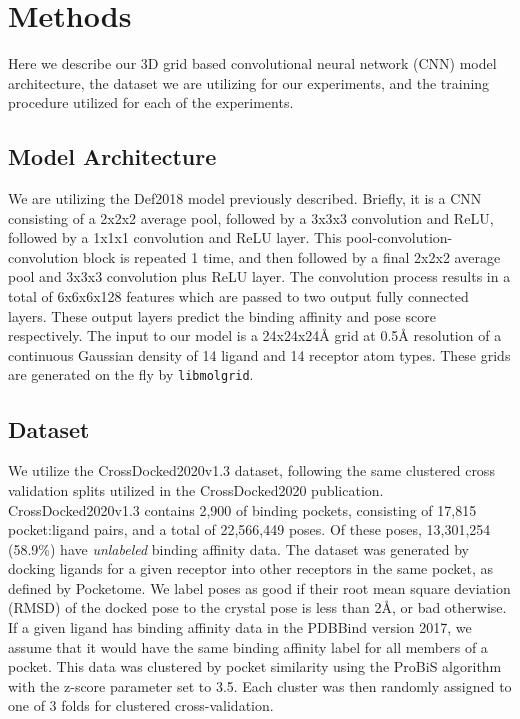 \documentclass[journal=jmcmar,manuscript=article]{achemso}
\begin{document}
\section{Methods}
Here we describe our 3D grid based convolutional neural network (CNN) model architecture, the dataset we are utilizing for our experiments, and the training procedure utilized for each of the experiments.

\subsection{Model Architecture}
We are utilizing the Def2018 model previously described.\cite{crossdocked2020}
Briefly, it is a CNN consisting of a 2x2x2 average pool, followed by a 3x3x3 convolution and ReLU, followed by a 1x1x1 convolution and ReLU layer. 
This pool-convolution-convolution block is repeated 1 time, and then followed by a final 2x2x2 average pool and 3x3x3 convolution plus ReLU layer.
The convolution process results in a total of 6x6x6x128 features which are passed to  two output fully connected layers.
These output layers predict the binding affinity and pose score respectively.
The input to our model is a 24x24x24{\AA} grid at 0.5{\AA} resolution of a continuous Gaussian density of 14 ligand and 14 receptor atom types.
These grids are generated on the fly by \texttt{libmolgrid}.\cite{sunseri2019libmolgrid}

\subsection{Dataset}
We utilize the CrossDocked2020v1.3 dataset, following the same clustered cross validation splits utilized in the CrossDocked2020 publication.\cite{crossdocked2020}
CrossDocked2020v1.3 contains 2,900 of binding pockets, consisting of 17,815 pocket:ligand pairs, and a total of 22,566,449 poses.
Of these poses, 13,301,254 (58.9\%) have \emph{unlabeled} binding affinity data.
The dataset was generated by docking ligands for a given receptor into other receptors in the same pocket, as defined by Pocketome\cite{pocketome}.
We label poses as good if their root mean square deviation (RMSD) of the docked pose to the crystal pose is less than 2{\AA}, or bad otherwise.
If a given ligand has binding affinity data in the PDBBind version 2017, we assume that it would have the same binding affinity label for all members of a pocket.
This data was clustered by pocket similarity using the ProBiS \cite{ProBiS} algorithm with the z-score parameter set to 3.5.
Each cluster was then randomly assigned to one of 3 folds for clustered cross-validation.
\end{document}
